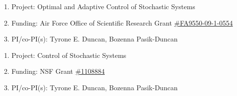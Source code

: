 \documentclass[letterpaper,10pt]{extarticle}
\newlength{\outerbordwidth}
\newcommand{\myhref}[3][blue]{\href{#2}{\color{#1}{#3}}}
\newcommand{\heading}[1]{
\parbox{\textwidth}{\setlength{\FrameSep}{\outerbordwidth}
\begin{shaded}
\setlength{\fboxsep}{0pt}\framebox[\textwidth][l]{\setlength{\fboxsep}{4pt}\fcolorbox{shadecolorB}{shadecolorB}{\textbf{\sffamily{\mbox{~}\makebox[6.395in][l]{\large #1} \vphantom{p\^{E}}}}}}
\end{shaded}}\vspace{-0.3cm}}
\begin{document}
\begin{itemize}[leftmargin=0.4cm, itemsep=0.5cm]
\begin{enumerate}[leftmargin=0.3cm, itemsep=-0.05ex]
	\item[] Project: Optimal and Adaptive Control of Stochastic Systems
	\item[] Funding: Air Force Office of Scientific Research Grant \href{https://apps.dtic.mil/sti/pdfs/ADA567576.pdf}{\#FA9550-09-1-0554}
	\item[] PI/co-PI(s): Tyrone E. Duncan, Bozenna Pasik-Duncan
\end{enumerate}


\begin{enumerate}[leftmargin=0.3cm, itemsep=-0.05ex]
	\item[] Project: Control of Stochastic Systems
	\item[] Funding: NSF Grant \href{https://www.nsf.gov/awardsearch/showAward?AWD_ID=1108884&HistoricalAwards=false}{\#1108884}
	\item[] PI/co-PI(s): Tyrone E. Duncan, Bozenna Pasik-Duncan
\end{enumerate}

\end{itemize}




\end{document}

